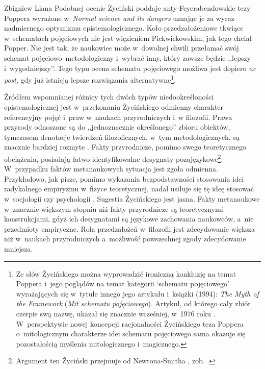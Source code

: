 \begin{artplenv}{Zbigniew Liana}
Podobnej ocenie Życiński
\parencites*[][s.~161n]{zycinski_teizm_1985}[][s.~140nn]{zycinski_structure_1988}[][s.~247nn]{zycinski_struktura_2013_liana} %
 poddaje anty-Feyerabendowskie tezy Poppera wyrażone w~\textit{Normal science and its dangers} 
\parencite*[][]{popper_normal_1970} %
 uznając je za wyraz nadmiernego optymizmu epistemologicznego. Koło przedzałożeniowe tkwiące w~schematach pojęciowych nie jest więzieniem Pickwickowskim, jak tego chciał Popper. Nie jest tak, że naukowiec może w~dowolnej chwili przełamać swój schemat pojęciowo–metodologiczny i~wybrać inny, który zawsze będzie ,,lepszy i~wygodniejszy''. Tego typu ocena schematu pojęciowego możliwa jest dopiero \textit{ex post}, gdy już istnieją lepsze rozwiązania alternatywne\footnote{Ze słów Życińskiego można wyprowadzić ironiczną konkluzję na temat Poppera i~jego poglądów na temat kategorii ‘schematu pojęciowego' wyrażających się w~tytule innego jego artykułu i~książki (1994): \textit{The Myth of the Framework} (\textit{Mit schematu pojęciowego}). Artykuł, od którego cały zbiór czerpie swą nazwę, ukazał się znacznie wcześniej, w~1976 roku 
\parencite[zob.][s.~33]{popper_myth_1994}. %
 W~perspektywie nowej koncepcji racjonalności Życińskiego teza Poppera o~mitologicznym charakterze idei schematu pojęciowego sama okazuje się pozostałością myślenia mitologicznego i~magicznego.}.

Źródłem wspomnianej różnicy tych dwóch typów niedookreśloności epistemologicznej jest w~przekonaniu Życińskiego odmienny charakter referencyjny pojęć i~praw w~naukach przyrodniczych i~w filozofii. Prawa przyrody odnoszone są do ,,jednoznacznie określonego'' zbioru obiektów, tymczasem denotacje twierdzeń filozoficznych, w~tym metodologicznych, są znacznie bardziej rozmyte
\parencite[][s.~163]{zycinski_teizm_1985}. %
 Fakty przyrodnicze, pomimo swego teoretycznego obciążenia, posiadają łatwo identyfikowalne desygnaty pozajęzykowe\footnote{Argument ten Życiński przejmuje od Newtona-Smitha 
\parencite*[][s.~179]{newton-smith_rationality_1981}, %
 zob. 
\parencites[][s.~255]{zycinski_elementy_1996}[][s.~346]{zycinski_elementy_2015}.%
}. W~przypadku faktów metanaukowych sytuacja jest zgoła odmienna. Przykładowo, jak pisze, pomimo wykazania bezpodstawności stosowania idei radykalnego empiryzmu w~fizyce teoretycznej, nadal usiłuje się tę ideę stosować w~socjologii czy psychologii 
\parencite[][s.~163]{zycinski_teizm_1985}. %
 Sugestia Życińskiego jest jasna. Fakty metanaukowe w~znacznie większym stopniu niż fakty przyrodnicze są teoretycznymi konstrukcjami, gdyż ich desygnatami są językowe zachowania naukowców, a~nie przedmioty empiryczne. Rola przedzałożeń w~filozofii jest zdecydowanie większa niż w~naukach przyrodniczych a~możliwość powszechnej zgody zdecydowanie mniejsza.


\end{artplenv}
